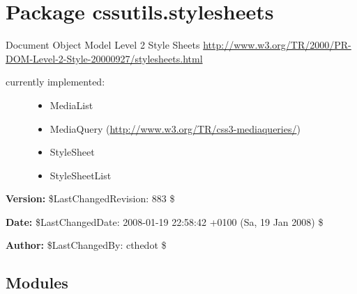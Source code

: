 %
%
%


\section{Package cssutils.stylesheets}

    \label{cssutils:stylesheets}

Document Object Model Level 2 Style Sheets
\href{http://www.w3.org/TR/2000/PR-DOM-Level-2-Style-20000927/stylesheets.html}{http://www.w3.org/TR/2000/PR-DOM-Level-2-Style-20000927/stylesheets.html}
\begin{description}
\item[{currently implemented:}] \leavevmode \begin{itemize}
\item {} 
MediaList

\item {} 
MediaQuery (\href{http://www.w3.org/TR/css3-mediaqueries/}{http://www.w3.org/TR/css3-mediaqueries/})

\item {} 
StyleSheet

\item {} 
StyleSheetList

\end{itemize}

\end{description}
\textbf{Version:} \$LastChangedRevision: 883 \$



\textbf{Date:} \$LastChangedDate: 2008-01-19 22:58:42 +0100 (Sa, 19 Jan 2008) \$



\textbf{Author:} \$LastChangedBy: cthedot \$





\subsection{Modules}

